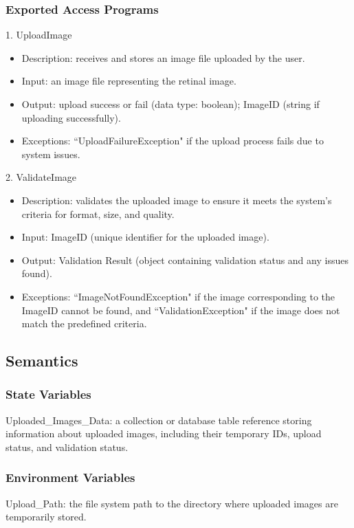 \documentclass[12pt, titlepage]{article}
\begin{document}
\subsubsection{Exported Access Programs}
1. UploadImage
\begin{itemize}
    \item Description: receives and stores an image file uploaded by the user.
    \item Input: an image file representing the retinal image.
    \item Output: upload success or fail (data type: boolean); ImageID (string if uploading successfully).
    \item Exceptions: ``UploadFailureException" if the upload process fails due to system issues.
\end{itemize}
2. ValidateImage
\begin{itemize}
    \item Description: validates the uploaded image to ensure it meets the system's criteria for format, size, and quality.
    \item Input: ImageID (unique identifier for the uploaded image).
    \item Output: Validation Result (object containing validation status and any issues found).
    \item Exceptions: ``ImageNotFoundException" if the image corresponding to the ImageID cannot be found, and ``ValidationException" if the image does not match the predefined criteria.
\end{itemize}

\subsection{Semantics}

\subsubsection{State Variables}
Uploaded\_Images\_Data: a collection or database table reference storing information about uploaded images, including their temporary IDs, upload status, and validation status.


\subsubsection{Environment Variables}
Upload\_Path: the file system path to the directory where uploaded images are temporarily stored.
\end{document}

